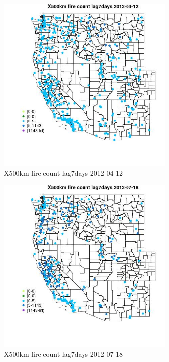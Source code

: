 \begin{figure} 
\centering  
\includegraphics[width=0.77\textwidth]{Code_Outputs/Report_ML_input_PM25_Step4_part_e_de_duplicated_aves_compiled_2019-05-14wNAs_MapObsX500km_fire_count_lag7days2012-04-12.jpg} 
\caption{\label{fig:Report_ML_input_PM25_Step4_part_e_de_duplicated_aves_compiled_2019-05-14wNAsMapObsX500km_fire_count_lag7days2012-04-12}X500km fire count lag7days 2012-04-12} 
\end{figure} 
 

\begin{figure} 
\centering  
\includegraphics[width=0.77\textwidth]{Code_Outputs/Report_ML_input_PM25_Step4_part_e_de_duplicated_aves_compiled_2019-05-14wNAs_MapObsX500km_fire_count_lag7days2012-07-18.jpg} 
\caption{\label{fig:Report_ML_input_PM25_Step4_part_e_de_duplicated_aves_compiled_2019-05-14wNAsMapObsX500km_fire_count_lag7days2012-07-18}X500km fire count lag7days 2012-07-18} 
\end{figure} 
 

